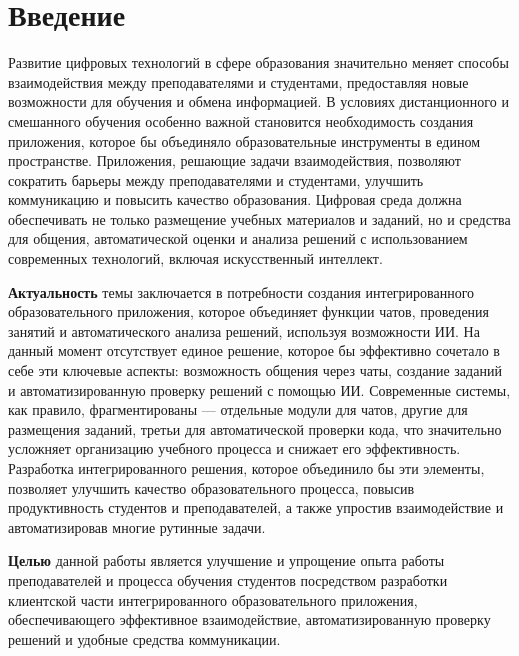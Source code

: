 \newpage
{}
\section*{Введение}

Развитие цифровых технологий в сфере образования значительно меняет способы взаимодействия между преподавателями и студентами, предоставляя новые возможности для обучения и обмена информацией. В условиях дистанционного и смешанного обучения особенно важной становится необходимость создания приложения, которое бы объединяло образовательные инструменты в едином пространстве. Приложения, решающие задачи взаимодействия, позволяют сократить барьеры между преподавателями и студентами, улучшить коммуникацию и повысить качество образования. Цифровая среда должна обеспечивать не только размещение учебных материалов и заданий, но и средства для общения, автоматической оценки и анализа решений с использованием современных технологий, включая искусственный интеллект.

\textbf{Актуальность} темы заключается в потребности создания интегрированного образовательного приложения, которое объединяет функции чатов, проведения занятий и автоматического анализа решений, используя возможности ИИ. На данный момент отсутствует единое решение, которое бы эффективно сочетало в себе эти ключевые аспекты: возможность общения через чаты, создание заданий и автоматизированную проверку решений с помощью ИИ. Современные системы, как правило, фрагментированы — отдельные модули для чатов, другие для размещения заданий, третьи для автоматической проверки кода, что значительно усложняет организацию учебного процесса и снижает его эффективность. Разработка интегрированного решения, которое объединило бы эти элементы, позволяет улучшить качество образовательного процесса, повысив продуктивность студентов и преподавателей, а также упростив взаимодействие и автоматизировав многие рутинные задачи.

\textbf{Целью} данной работы является улучшение и упрощение опыта работы преподавателей и процесса обучения студентов посредством разработки клиентской части интегрированного образовательного приложения, обеспечивающего эффективное взаимодействие, автоматизированную проверку решений и удобные средства коммуникации.

